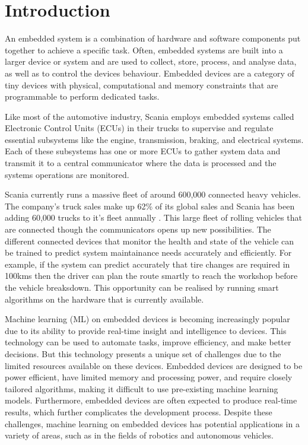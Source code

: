 \part{Introduction}

An embedded system is a combination of hardware and software components put together to achieve a specific task. Often, embedded systems are built into a larger device or system and are used to collect, store, process, and analyse data, as well as to control the device\textquotesingle s behaviour. Embedded devices are a category of tiny devices with physical, computational and memory constraints that are programmable to perform dedicated tasks.

Like most of the automotive industry, Scania employs embedded systems called Electronic Control Units (ECUs) in their trucks to supervise and regulate essential subsystems like the engine, transmission, braking, and electrical systems. Each of these subsystems has one or more ECUs to gather system data and transmit it to a central communicator where the data is processed and the systems operations are monitored.

Scania currently runs a massive fleet of around 600,000 connected heavy vehicles. The company's truck sales make up 62\% of its global sales and Scania has been adding 60,000 trucks to it's fleet annually \cite{scania-report}. This large fleet of rolling vehicles that are connected though the communicators opens up new possibilities. The different connected devices that monitor the health and state of the vehicle can be trained to predict system maintainance needs accurately and efficiently. For example, if the system can predict accurately that tire changes are required in 100kms then the driver can plan the route smartly to reach the workshop before the vehicle breaksdown. This opportunity can be realised by running smart algorithms on the hardware that is currently available.

Machine learning (ML) on embedded devices is becoming increasingly popular due to its ability to provide real-time insight and intelligence to devices. This technology can be used to automate tasks, improve efficiency, and make better decisions. But this technology presents a unique set of challenges due to the limited resources available on these devices. Embedded devices are designed to be power efficient, have limited memory and processing power, and require closely tailored algorithms, making it difficult to use pre-existing machine learning models. Furthermore, embedded devices are often expected to produce real-time results, which further complicates the development process. Despite these challenges, machine learning on embedded devices has potential applications in a variety of areas, such as in the fields of robotics and autonomous vehicles.

